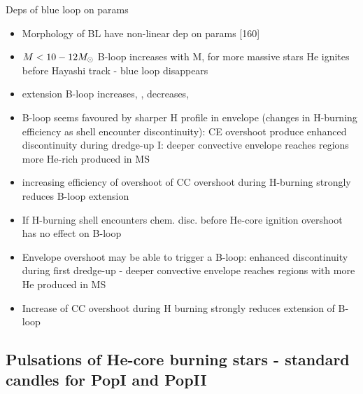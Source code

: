 \begin{frame}{Deps of blue loop on params}
	\begin{itemize}
	\item Morphology of BL have non-linear dep on params [160]
	\item $M<10-12M_{\odot}$ B-loop increases with M, for more massive stars He ignites before Hayashi track - blue loop disappears
	\item extension B-loop increases, , decreases, 
	\item B-loop seems favoured by sharper H profile in envelope (changes in H-burning efficiency as shell encounter discontinuity): CE overshoot produce enhanced discontinuity during dredge-up I: deeper convective envelope reaches regions more He-rich produced in MS
	\item increasing efficiency of overshoot of CC overshoot during H-burning strongly reduces B-loop extension
	\item If H-burning shell encounters chem. disc. before He-core ignition overshoot has no effect on B-loop
	\item Envelope overshoot may be able to trigger a B-loop: enhanced discontinuity during first dredge-up - deeper convective envelope reaches regions with more He produced in MS
	\item Increase of CC overshoot during H burning strongly reduces extension of B-loop
\end{itemize}
\end{frame}

\subsection{Pulsations of He-core burning stars - standard candles for PopI and PopII}

